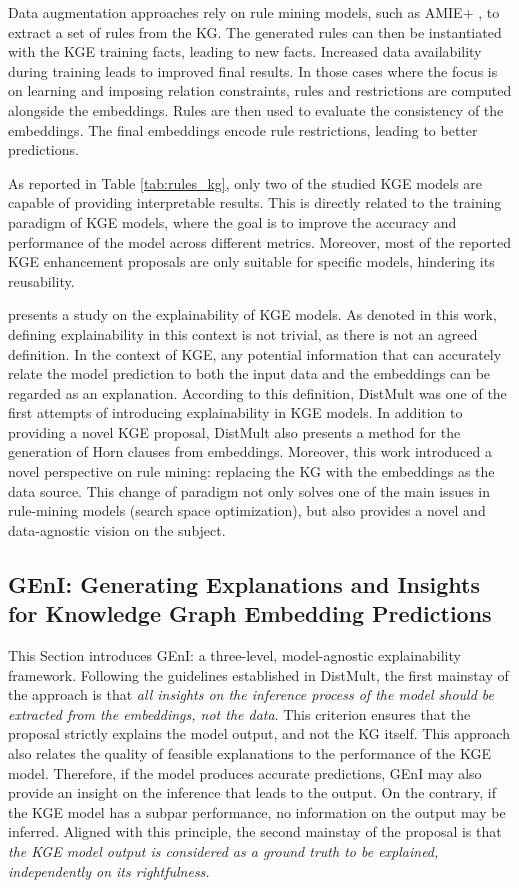 Data augmentation approaches rely on rule mining models, such as AMIE+ \citep{amie+}, to extract a set of rules from the KG. The generated rules can then be instantiated with the KGE training facts, leading to new facts. Increased data availability during training leads to improved final results. In those cases where the focus is on learning and imposing relation constraints, rules and restrictions are computed alongside the embeddings. Rules are then used to evaluate the consistency of the embeddings. The final embeddings encode rule restrictions, leading to better predictions.

As reported in Table \ref{tab:rules_kg}, only two of the studied KGE models are capable of providing interpretable results. This is directly related to the training paradigm of KGE models, where the goal is to improve the accuracy and performance of the model across different metrics. Moreover, most of the reported KGE enhancement proposals are only suitable for specific models, hindering its reusability.

\cite{bianchi_kge_explainability_2020} presents a study on the explainability of KGE models. As denoted in this work, defining explainability in this context is not trivial, as there is not an agreed definition. In the context of KGE, any potential information that can accurately relate the model prediction to both the input data and the embeddings can be regarded as an explanation. According to this definition, DistMult \citep{distmult} was one of the first attempts of introducing explainability in KGE models. In addition to providing a novel KGE proposal, DistMult also presents a method for the generation of Horn clauses from embeddings. Moreover, this work introduced a novel perspective on rule mining: replacing the KG with the embeddings as the data source. This change of paradigm not only solves one of the main issues in rule-mining models (search space optimization), but also provides a novel and data-agnostic vision on the subject.

\subsection{GEnI: Generating Explanations and Insights for Knowledge Graph Embedding Predictions}\label{6_sec:subsec:geni}
This Section introduces GEnI: a three-level, model-agnostic explainability framework. Following the guidelines established in DistMult, the first mainstay of the approach is that \textit{all insights on the inference process of the model should be extracted from the embeddings, not the data}. This criterion ensures that the proposal strictly explains the model output, and not the KG itself. This approach also relates the quality of feasible explanations to the performance of the KGE model. Therefore, if the model produces accurate predictions, GEnI may also provide an insight on the inference that leads to the output. On the contrary, if the KGE model has a subpar performance, no information on the output may be inferred. Aligned with this principle, the second mainstay of the proposal is that \textit{the KGE model output is considered as a ground truth to be explained, independently on its rightfulness.}

